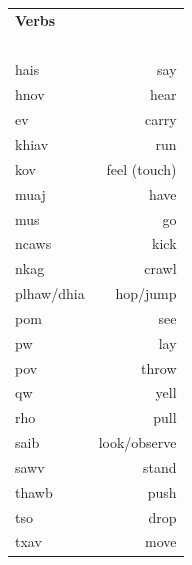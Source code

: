 \documentclass{article}
\begin{document}
\begin{multicols}{2}
\begin{tabular}{l r}
\end{tabular}

\begin{tabular}{l r}
\textbf{Verbs} \\
~\\
hais &say\\
hnov &hear\\
ev &carry\\
khiav &run\\
kov &feel (touch)\\
muaj &have\\
mus &go\\
ncaws &kick\\
nkag &crawl\\
plhaw/dhia &hop/jump\\
pom &see\\
pw &lay\\
pov &throw\\
qw &yell\\
rho &pull\\
saib &look/observe\\
sawv &stand\\
thawb &push\\
tso &drop\\
txav &move\\
\end{tabular}

\end{multicols}

\clearpage
\end{document}
